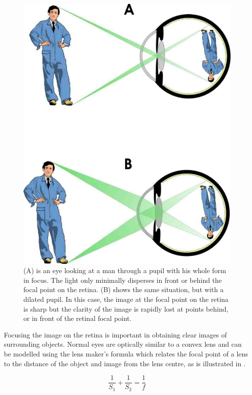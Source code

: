 \begin{figure}[H]
\centering
  \includegraphics{figures/light_path}
\caption{(A) is an eye looking at a man through a pupil with his whole form in focus.
		The light only minimally disperses in front or behind the focal point
		on the retina. (B) shows the same situation, but with a dilated pupil.
		In this case, the image at the focal point on the retina is sharp but
		the clarity of the image is rapidly lost at points behind, or in front
		of the retinal focal point.}
\label{fig:light_journey}
\end{figure}

Focusing the image on the retina is important in obtaining clear images of
surrounding objects. Normal eyes are optically similar to a convex lens and
can be modelled using the lens maker's formula 
which relates the focal point of a lens to the distance of the object and
image from the lens centre, as is illustrated in .

\begin{equation}
\frac{1}{S_1} + \frac{1}{S_2} = \frac{1}{f}
\label{eq:lens_makers}
\end{equation}

